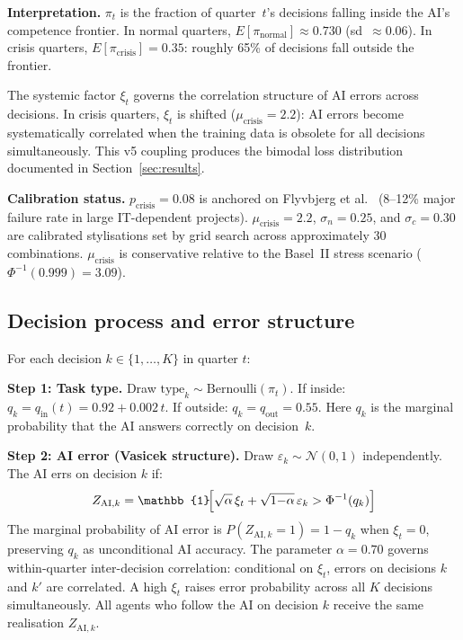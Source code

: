 \documentclass[11pt,a4paper]{article}
\newcommand{\ind}{\mathbb{1}}   %
\begin{document}
\begin{appendices}
\textbf{Interpretation.}
$\pi_t$ is the fraction of quarter~$t$'s decisions falling inside the AI's
competence frontier. In normal quarters,
$E[\pi_{\text{normal}}] \approx 0.730$ (sd~$\approx 0.06$). In crisis
quarters, $E[\pi_{\text{crisis}}] = 0.35$: roughly 65\% of decisions fall
outside the frontier.

The systemic factor $\xi_t$ governs the correlation structure of AI errors
across decisions. In crisis quarters, $\xi_t$ is shifted
($\mu_{\text{crisis}} = 2.2$): AI errors become systematically correlated
when the training data is obsolete for all decisions simultaneously. This v5
coupling produces the bimodal loss distribution documented in
Section~\ref{sec:results}.

\textbf{Calibration status.}
$p_{\text{crisis}} = 0.08$ is anchored on Flyvbjerg et
al.~\cite{flyvbjerg_jmis_2022} (8--12\% major failure rate in large
IT-dependent projects).
$\mu_{\text{crisis}} = 2.2$, $\sigma_n = 0.25$, and $\sigma_c = 0.30$ are
calibrated stylisations set by grid search across approximately 30
combinations.
$\mu_{\text{crisis}}$ is conservative relative to the Basel~II stress
scenario ($\Phi^{-1}(0.999) = 3.09$).

\subsection{Decision process and error
structure}\label{app:model:decisions}

For each decision $k \in \{1, \ldots, K\}$ in quarter $t$:

\textbf{Step 1: Task type.}
Draw $\mathrm{type}_k \sim \mathrm{Bernoulli}(\pi_t)$.
If inside: $q_k = q_{\text{in}}(t) = 0.92 + 0.002\,t$.
If outside: $q_k = q_{\text{out}} = 0.55$.
Here $q_k$ is the marginal probability that the AI answers correctly on
decision~$k$.

\textbf{Step 2: AI error (Vasicek structure).}
Draw $\varepsilon_k \sim \mathcal{N}(0,1)$ independently. The AI errs on
decision $k$ if:
\[
  Z_{\text{AI},k}
  = \ind\!\Bigl[
      \sqrt{\alpha}\,\xi_t + \sqrt{1{-}\alpha}\,\varepsilon_k
      > \Phi^{-1}(q_k)
    \Bigr]
\]
The marginal probability of AI error is $P(Z_{\text{AI},k} = 1) = 1 - q_k$
when $\xi_t = 0$, preserving $q_k$ as unconditional AI accuracy. The
parameter $\alpha = 0.70$ governs within-quarter inter-decision correlation:
conditional on $\xi_t$, errors on decisions $k$ and $k'$ are correlated. A
high $\xi_t$ raises error probability across all $K$ decisions
simultaneously. All agents who follow the AI on decision $k$ receive the
same realisation $Z_{\text{AI},k}$.


\end{appendices}
\end{document}
